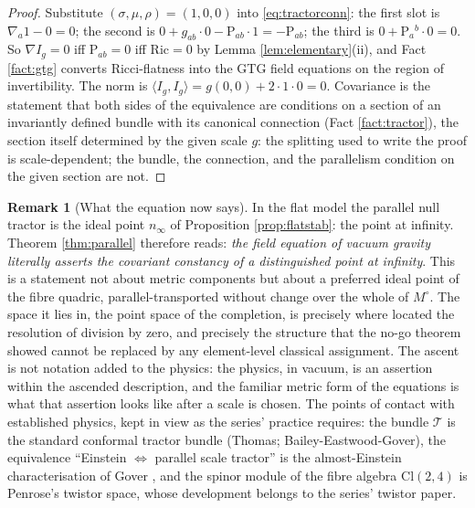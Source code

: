 \documentclass[11pt]{article}
\theoremstyle{definition}
\newtheorem{remark}[theorem]{Remark}
\newcommand{\Cl}{\mathrm{Cl}}
\newcommand{\Ric}{\mathrm{Ric}}
\newcommand{\Sch}{\mathrm{P}}
\newcommand{\nInf}{n_\infty}
\newcommand{\ip}[2]{\langle #1, #2\rangle}
\begin{document}
\begin{proof}
Substitute $(\sigma, \mu, \rho) = (1, 0, 0)$ into \eqref{eq:tractorconn}: the first slot is $\nabla_a 1 - 0 = 0$; the second is $0 + g_{ab}\cdot 0 - \Sch_{ab}\cdot 1 = -\Sch_{ab}$; the third is $0 + \Sch_a{}^b \cdot 0 = 0$. So $\nabla I_g = 0$ iff $\Sch_{ab} = 0$ iff $\Ric = 0$ by Lemma \ref{lem:elementary}(ii), and Fact \ref{fact:gtg} converts Ricci-flatness into the GTG field equations on the region of invertibility. The norm is $\ip{I_g}{I_g} = g(0,0) + 2 \cdot 1 \cdot 0 = 0$. Covariance is the statement that both sides of the equivalence are conditions on a section of an invariantly defined bundle with its canonical connection (Fact \ref{fact:tractor}), the section itself determined by the given scale $g$: the splitting used to write the proof is scale-dependent; the bundle, the connection, and the parallelism condition on the given section are not.
\end{proof}

\begin{remark}[What the equation now says]\label{rem:interpret}
In the flat model the parallel null tractor is the ideal point $\nInf$ of Proposition \ref{prop:flatstab}: the point at infinity. Theorem \ref{thm:parallel} therefore reads: \emph{the field equation of vacuum gravity literally asserts the covariant constancy of a distinguished point at infinity}. This is a statement not about metric components but about a preferred ideal point of the fibre quadric, parallel-transported without change over the whole of $M^\circ$. The space it lies in, the point space of the completion, is precisely where \cite[Thm.~4.10]{ButlerT1} located the resolution of division by zero, and precisely the structure that the no-go theorem showed cannot be replaced by any element-level classical assignment. The ascent is not notation added to the physics: the physics, in vacuum, is an assertion within the ascended description, and the familiar metric form of the equations is what that assertion looks like after a scale is chosen. The points of contact with established physics, kept in view as the series' practice requires: the bundle $\mathcal{T}$ is the standard conformal tractor bundle (Thomas; Bailey-Eastwood-Gover), the equivalence ``Einstein $\Leftrightarrow$ parallel scale tractor'' is the almost-Einstein characterisation of Gover \cite{Gover2010}, and the spinor module of the fibre algebra $\Cl(2,4)$ is Penrose's twistor space, whose development belongs to the series' twistor paper.
\end{remark}
\end{document}

